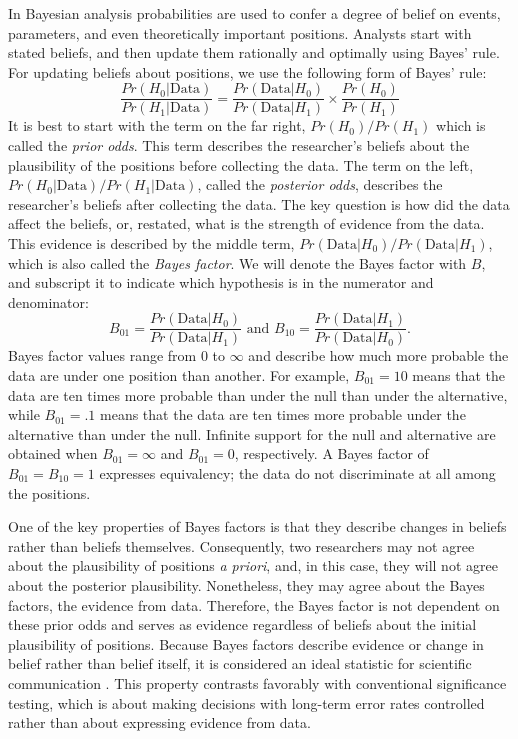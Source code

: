 \documentclass[man]{apa6}
\begin{document}
In Bayesian analysis probabilities are used to confer a degree of belief on events, parameters, and even theoretically important positions.  Analysts start with stated beliefs, and then update them rationally and optimally using Bayes' rule.  For updating beliefs about positions, we use the following form of Bayes' rule:
\begin{equation}
\frac{Pr(H_0 | \mbox{Data})}{Pr(H_1 | \mbox{Data})} = \frac{Pr(\mbox{Data} | H_0)}{Pr(\mbox{Data} | H_1)} \times \frac{Pr(H_0)}{Pr (H_1)} 
\end{equation}
It is best to start with the term on the far right, $Pr(H_0)/Pr(H_1)$ which is called the {\em prior odds}.  This term describes the researcher's beliefs about the plausibility of the positions before collecting the data.  The term on the left, $Pr(H_0 | \mbox{Data})/Pr(H_1 | \mbox{Data})$, called the {\em posterior odds}, describes the researcher's beliefs after collecting the data.   The key question is how did the data affect the beliefs, or, restated, what is the strength of evidence from the data.  This evidence is described by the middle term,  $Pr(\mbox{Data} | H_0)/Pr(\mbox{Data} | H_1)$, which is also called the {\em Bayes factor}.  We will denote the Bayes factor with $B$, and subscript it to indicate which hypothesis is in the numerator and denominator:
\[
B_{01} = \frac{Pr(\mbox{Data} | H_0)}{Pr(\mbox{Data} | H_1)} \mbox{ and } B_{10} = \frac{Pr(\mbox{Data} | H_1)}{Pr(\mbox{Data} | H_0)}.
\]
Bayes factor values range from 0 to $\infty$ and describe how much more probable the data are under one position than another.  For example, $B_{01}=10$ means that the data are ten times more probable than under the null than under the alternative, while $B_{01}=.1$ means that the data are ten times more probable under the alternative than under the null.  Infinite support for the null and alternative are obtained when $B_{01}=\infty$ and $B_{01}=0$, respectively.  A Bayes factor of $B_{01}=B_{10}=1$ expresses equivalency; the data do not discriminate at all among the positions.

One of the key properties of Bayes factors is that they describe changes in beliefs rather than beliefs themselves.  Consequently, two researchers may not agree about the plausibility of positions {\em a priori}, and, in this case, they will not agree about the posterior plausibility.  Nonetheless, they may agree about the Bayes factors, the evidence from data.  Therefore, the Bayes factor is not dependent on these prior odds and serves as evidence regardless of beliefs about the initial plausibility of positions.  Because Bayes factors describe evidence or change in belief rather than belief itself, it is considered an ideal statistic for scientific communication \citep{Jeffreys:1961}.  This property contrasts favorably with conventional significance testing, which is about making decisions with long-term error rates controlled rather than about expressing evidence from data. 
\end{document}

